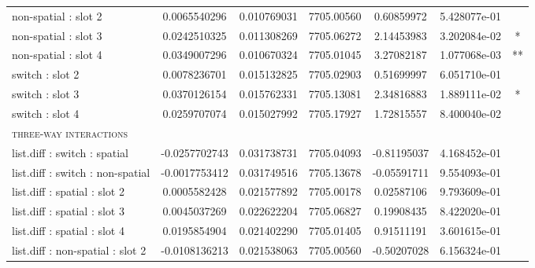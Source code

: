 \begin{center}
\begin{longtable}{l S[table-format=>1.3] S[table-format=1.3] S[table-format=4.1,round-precision=1] S[table-format=>2.2,round-precision=2] S[table-format=>1.3] c }
non-spatial : slot 2                       &  0.0065540296  &           0.010769031  &            7705.00560  &             0.60859972  &           5.428077e-01  &         \\
non-spatial : slot 3                       &  0.0242510325  &           0.011308269  &            7705.06272  &             2.14453983  &           3.202084e-02  &    *    \\
non-spatial : slot 4                       &  0.0349007296  &           0.010670324  &            7705.01045  &             3.27082187  &           1.077068e-03  &    **   \\
switch : slot 2                            &  0.0078236701  &           0.015132825  &            7705.02903  &             0.51699997  &           6.051710e-01  &         \\
switch : slot 3                            &  0.0370126154  &           0.015762331  &            7705.13081  &             2.34816883  &           1.889111e-02  &    *    \\
switch : slot 4                            &  0.0259707074  &           0.015027992  &            7705.17927  &             1.72815557  &           8.400040e-02  &         \\ \midrule
\scshape{three-way interactions}           &                &                        &                        &                         &                         &         \\
list.diff : switch : spatial               & -0.0257702743  &           0.031738731  &            7705.04093  &            -0.81195037  &           4.168452e-01  &         \\
list.diff : switch : non-spatial           & -0.0017753412  &           0.031749516  &            7705.13678  &            -0.05591711  &           9.554093e-01  &         \\
list.diff : spatial : slot 2               &  0.0005582428  &           0.021577892  &            7705.00178  &             0.02587106  &           9.793609e-01  &         \\
list.diff : spatial : slot 3               &  0.0045037269  &           0.022622204  &            7705.06827  &             0.19908435  &           8.422020e-01  &         \\
list.diff : spatial : slot 4               &  0.0195854904  &           0.021402290  &            7705.01405  &             0.91511191  &           3.601615e-01  &         \\
list.diff : non-spatial : slot 2           & -0.0108136213  &           0.021538063  &            7705.00560  &            -0.50207028  &           6.156324e-01  &         \\

\end{longtable}
\end{center}
